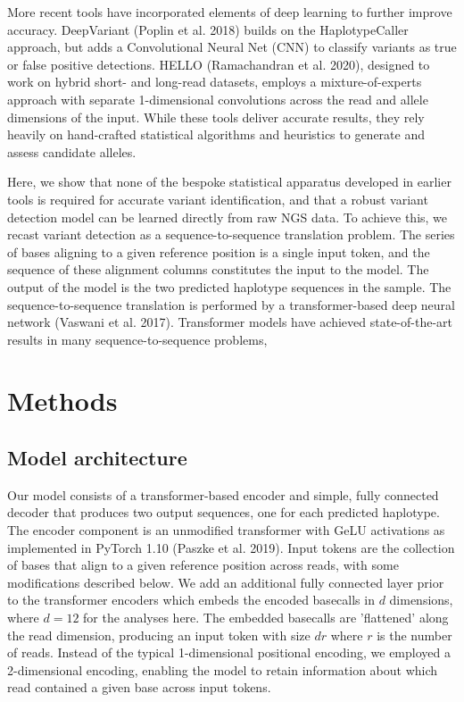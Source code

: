 \documentclass[]{article}
\begin{document}
More recent tools have incorporated elements of deep learning to further improve accuracy. DeepVariant (Poplin et al. 2018) builds on the HaplotypeCaller approach, but adds a Convolutional Neural Net (CNN) to classify variants as true or false positive detections. HELLO (Ramachandran et al. 2020), designed to work on hybrid short- and long-read datasets, employs a mixture-of-experts approach with separate 1-dimensional convolutions across the read and allele dimensions of the input. While these tools deliver accurate results, they rely heavily on hand-crafted statistical algorithms and heuristics to generate and assess candidate alleles. 


Here, we show that none of the bespoke statistical apparatus developed in earlier tools is required for accurate variant identification, and that a robust variant detection model can be learned directly from raw NGS data. To achieve this, we recast variant detection as a sequence-to-sequence translation problem. The series of bases aligning to a given reference position is a single input token, and the sequence of these alignment columns constitutes the input to the model. The output of the model is the two predicted haplotype sequences in the sample. The sequence-to-sequence translation is performed by a transformer-based deep neural network (Vaswani et al. 2017). Transformer models have achieved state-of-the-art results in many sequence-to-sequence problems, 


\section{Methods}

\subsection{Model architecture}

Our model consists of a transformer-based encoder and simple, fully connected decoder that produces two output sequences, one for each predicted haplotype. The encoder component is an unmodified transformer with GeLU activations as implemented in PyTorch 1.10 (Paszke et al. 2019). Input tokens are the collection of bases that align to a given reference position across reads, with some modifications described below. We add an additional fully connected layer prior to the transformer encoders which embeds the encoded basecalls in $d$ dimensions, where $d=12$ for the analyses here. The embedded basecalls are 'flattened' along the read dimension, producing an input token with size $dr$ where $r$ is the number of reads. Instead of the typical 1-dimensional positional encoding, we employed a 2-dimensional encoding, enabling the model to retain information about which read contained a given base across input tokens. 
\end{document}
